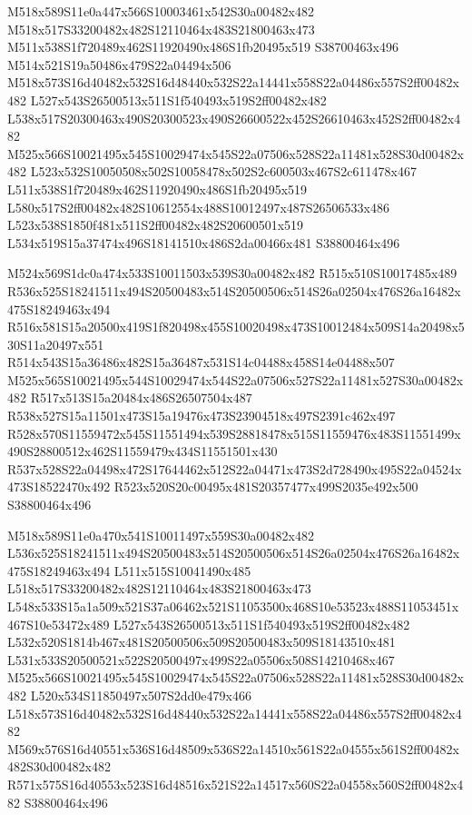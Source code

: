 \documentclass{article}
\begin{document}
\begin{multicols}{2}
M518x589S11e0a447x566S10003461x542S30a00482x482 M518x517S33200482x482S12110464x483S21800463x473 M511x538S1f720489x462S11920490x486S1fb20495x519 S38700463x496 M514x521S19a50486x479S22a04494x506 M518x573S16d40482x532S16d48440x532S22a14441x558S22a04486x557S2ff00482x482 L527x543S26500513x511S1f540493x519S2ff00482x482 L538x517S20300463x490S20300523x490S26600522x452S26610463x452S2ff00482x482 M525x566S10021495x545S10029474x545S22a07506x528S22a11481x528S30d00482x482 L523x532S10050508x502S10058478x502S2c600503x467S2c611478x467 L511x538S1f720489x462S11920490x486S1fb20495x519 L580x517S2ff00482x482S10612554x488S10012497x487S26506533x486 L523x538S1850f481x511S2ff00482x482S20600501x519 L534x519S15a37474x496S18141510x486S2da00466x481 S38800464x496

M524x569S1dc0a474x533S10011503x539S30a00482x482 R515x510S10017485x489 R536x525S18241511x494S20500483x514S20500506x514S26a02504x476S26a16482x475S18249463x494 R516x581S15a20500x419S1f820498x455S10020498x473S10012484x509S14a20498x530S11a20497x551 R514x543S15a36486x482S15a36487x531S14c04488x458S14e04488x507 M525x565S10021495x544S10029474x544S22a07506x527S22a11481x527S30a00482x482 R517x513S15a20484x486S26507504x487 R538x527S15a11501x473S15a19476x473S23904518x497S2391c462x497 R528x570S11559472x545S11551494x539S28818478x515S11559476x483S11551499x490S28800512x462S11559479x434S11551501x430 R537x528S22a04498x472S17644462x512S22a04471x473S2d728490x495S22a04524x473S18522470x492 R523x520S20c00495x481S20357477x499S2035e492x500 S38800464x496

M518x589S11e0a470x541S10011497x559S30a00482x482 L536x525S18241511x494S20500483x514S20500506x514S26a02504x476S26a16482x475S18249463x494 L511x515S10041490x485 L518x517S33200482x482S12110464x483S21800463x473 L548x533S15a1a509x521S37a06462x521S11053500x468S10e53523x488S11053451x467S10e53472x489 L527x543S26500513x511S1f540493x519S2ff00482x482 L532x520S1814b467x481S20500506x509S20500483x509S18143510x481 L531x533S20500521x522S20500497x499S22a05506x508S14210468x467 M525x566S10021495x545S10029474x545S22a07506x528S22a11481x528S30d00482x482 L520x534S11850497x507S2dd0e479x466 L518x573S16d40482x532S16d48440x532S22a14441x558S22a04486x557S2ff00482x482 M569x576S16d40551x536S16d48509x536S22a14510x561S22a04555x561S2ff00482x482S30d00482x482 R571x575S16d40553x523S16d48516x521S22a14517x560S22a04558x560S2ff00482x482 S38800464x496


\end{multicols}
\end{document}
